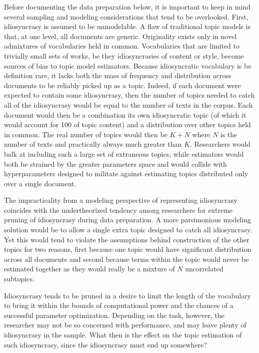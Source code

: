 \documentclass[]{book}
\theoremstyle{definition}
\theoremstyle{definition}
\theoremstyle{definition}
\theoremstyle{remark}
\begin{document}
Before documenting the data preparation below, it is important to keep
in mind several sampling and modeling considerations that tend to be
overlooked. First, idiosyncrasy is assumed to be unmodelable. A flaw of
traditional topic models is that, at one level, all documents are
generic. Originality exists only in novel admixtures of vocabularies
held in common. Vocabularies that are limited to trivially small sets of
works, be they idiosyncrasies of content or style, become sources of
bias to topic model estimators. Because idiosyncratic vocabulary is be
definition rare, it lacks both the mass of frequency and distribution
across documents to be reliably picked up as a topic. Indeed, if each
document were expected to contain some idiosyncrasy, then the number of
topics needed to catch all of the idiosyncrasy would be equal to the
number of texts in the corpus. Each document would then be a combination
its own idiosyncratic topic (of which it would account for 100 of topic
content) and a distribution over other topics held in common. The real
number of topics would then be \(K+N\) where \(N\) is the number of
texts and practically always much greater than \(K\). Researchers would
balk at including such a large set of extraneous topics, while
estimators would both be strained by the greater parameters space and
would collide with hyperparameters designed to militate against
estimating topics distributed only over a single document.

The impracticality from a modeling perspective of representing
idiosyncrasy coincides with the undertheorized tendency among
researchers for extreme pruning of idiosyncrasy during data preparation.
A more parsimonious modeling solution would be to allow a single extra
topic designed to catch all idiosyncrasy. Yet this would tend to violate
the assumptions behind construction of the other topics for two reasons,
first because one topic would have significant distribution across all
documents and second because terms within the topic would never be
estimated together as they would really be a mixture of \(N\)
uncorrelated subtopics.

Idiosyncrasy tends to be pruned in a desire to limit the length of the
vocabulary to bring it within the bounds of computational power and the
chances of a successful parameter optimization. Depending on the task,
however, the researcher may not be so concerned with performance, and
may leave plenty of idiosyncrasy in the sample. What then is the effect
on the topic estimation of such idiosyncrasy, since the idiosyncrasy
must end up somewhere?
\end{document}
